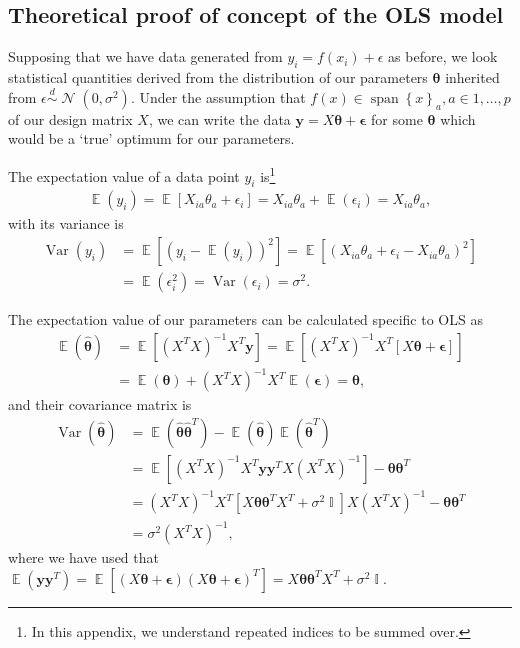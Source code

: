 \documentclass[twocolumn,english,notitlepage]{article}
\renewcommand{\vec}[1]{\boldsymbol{#1}}
\newcommand{\pclosed}[1]{\left(#1\right)}
\newcommand{\bclosed}[1]{\left[#1\right]}
\newcommand{\cclosed}[1]{\left\{#1\right\}}
\newcommand{\normal}[2]{\operatorname{\mathcal{N}}\pclosed{#1,#2}}
\newcommand{\distas}{\overset{d}{\sim}}
\renewcommand{\expval}{\operatorname{\mathbb{E}}}
\renewcommand{\var}{\operatorname{Var}}
\DeclareMathOperator{\eye}{\mathbb{I}}
\newcommand{\thetahat}{\hat{\theta}}
\begin{document}
\begin{appendices}
    \section{Theoretical proof of concept of the OLS model} \label{app:sec:OLS_proof}
        Supposing that we have data generated from $y_i = f(x_i)+\epsilon$ as before, we look statistical quantities derived from the distribution of our parameters $\vec{\theta}$ inherited from $\epsilon\distas \normal{0}{\sigma^2}$. Under the assumption that $f(x) \in \operatorname{span}\cclosed{x}_a, a\in 1,\ldots,p$ of our design matrix $X$, we can write the data $\vec{y} = X\vec{\theta} + \vec{\epsilon}$ for some $\vec{\theta}$ which would be a `true' optimum for our parameters.

        The expectation value of a data point $y_i$ is\footnote{In this appendix, we understand repeated indices to be summed over.}
        \begin{align}
            \expval(y_i) = \expval\bclosed{X_{ia} \theta_a + \epsilon_i} = X_{ia}\theta_a + \expval(\epsilon_i) = X_{ia}\theta_a,
        \end{align}
        with its variance is
        \begin{align} \nonumber
            \var(y_i) &= \expval\bclosed{\pclosed{y_i-\expval\pclosed{y_i}}^2} = \expval\bclosed{\pclosed{X_{ia}\theta_a + \epsilon_i - X_{ia}\theta_a}^2} \\
            &= \expval\pclosed{\epsilon_i^2} = \var\pclosed{\epsilon_i} = \sigma^2.
        \end{align}

        The expectation value of our parameters can be calculated specific to OLS as
        \begin{align} \nonumber
            \expval(\vec{\thetahat}) &= \expval\bclosed{(X^TX)^{-1}X^T \vec{y}} = \expval\bclosed{(X^TX)^{-1}X^T \bclosed{X\vec{\theta} + \vec{\epsilon}} } \\
            &= \expval\pclosed{\vec{\theta}} + {(X^TX)}^{-1}X^T \expval\pclosed{\vec{\epsilon}} = \vec{\theta},
        \end{align}
        and their covariance matrix is
        \begin{align} \nonumber
            \var(\vec{\thetahat}) &= \expval({\vec{\thetahat} \vec{\thetahat}^T}) - \expval({\vec{\thetahat}}) \expval({\vec{\thetahat}^T}) \\ \nonumber
            &= \expval\bclosed{(X^TX)^{-1}X^T \vec{y} \vec{y}^T X (X^TX)^{-1}} - \vec{\theta}\vec{\theta}^T \\ \nonumber
            &= (X^TX)^{-1}X^T \bclosed{X\vec{\theta}\vec{\theta}^TX^T + \sigma^2 \eye}X (X^TX)^{-1} - \vec{\theta}\vec{\theta}^T \\
            &= \sigma^2 (X^TX)^{-1},
        \end{align}
        where we have used that \(\expval(\vec{y}\vec{y}^T) = \expval\bclosed{(X\vec{\theta}+\vec{\epsilon})(X\vec{\theta}+\vec{\epsilon})^T} = X\vec{\theta}\vec{\theta}^TX^T + \sigma^2 \eye\).



\end{appendices}
\end{document}
